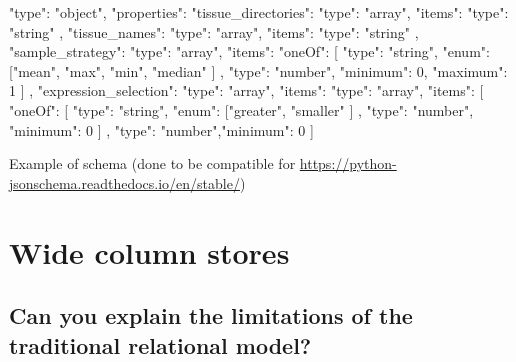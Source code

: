 \documentclass{article}
\begin{document}
\begin{center}
 \begin{listing}
   \begin{json}
     {"type": "object",
    "properties": {
        "tissue_directories": {
            "type": "array",
            "items": {
                "type": "string"
            }
        },
        "tissue_names": {
            "type": "array",
            "items": {
                "type": "string"
            }
        },
        "sample_strategy": {
            "type": "array",
            "items": {
                "oneOf": [
                    {
                        "type": "string",
                        "enum": ["mean", "max", "min", "median"
                        ]
                    },
                    {
                        "type": "number", "minimum": 0, "maximum": 1
                    }
                ]
            }
        },
        "expression_selection": {
            "type": "array",
            "items": {
                "type": "array",
                "items": [
                    {
                        "oneOf": [
                            {
                                "type": "string",
                                "enum": ["greater", "smaller"
                                ]
                            },
                            {
                                "type": "number", "minimum": 0
                            }
                        ]
                    },
                    {
                        "type": "number","minimum": 0
                    }
                    ]
                  }
                }
              }
    }
   \end{json}
    \caption[Test]{Example of schema (done to be compatible for \url{https://python-jsonschema.readthedocs.io/en/stable/})}
 \label{lst:test3}
 \end{listing}
\end{center}



\pagebreak

\section{Wide column stores}
\subsection{Can you explain the limitations of the traditional relational model?}
\end{document}
